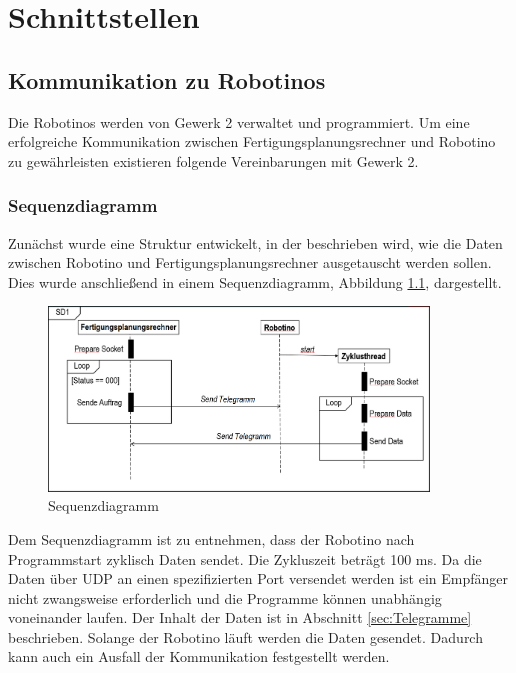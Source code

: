 
\chapter{Schnittstellen}
\label{sec:Schnittstellen}


\section{Kommunikation zu Robotinos}
\label{sec:Gewerk2Protokoll}

Die Robotinos werden von Gewerk 2 verwaltet und programmiert. Um eine erfolgreiche Kommunikation zwischen Fertigungsplanungsrechner und Robotino zu gewährleisten existieren folgende Vereinbarungen mit Gewerk 2.

\subsection{Sequenzdiagramm}
\label{sec:sequenzdiagram}

Zunächst wurde eine Struktur entwickelt, in der beschrieben wird, wie die Daten zwischen Robotino und Fertigungsplanungsrechner ausgetauscht werden sollen. Dies wurde anschließend in einem Sequenzdiagramm, Abbildung \ref{fig:Sequenzdiagramm}, dargestellt. 

\begin{figure}[htb]
    \centering
    \includegraphics[width=0.9\textwidth]{Abbildungen/Sequenzdiagramm.PNG}
    \caption{Sequenzdiagramm}		
    \label{fig:Sequenzdiagramm}
\end{figure}

Dem Sequenzdiagramm ist zu entnehmen, dass der Robotino nach Programmstart zyklisch Daten sendet. Die Zykluszeit beträgt 100 ms. Da die Daten über UDP an einen spezifizierten Port versendet werden ist ein Empfänger nicht zwangsweise erforderlich und die Programme können unabhängig voneinander laufen. Der Inhalt der Daten ist in Abschnitt \ref{sec:Telegramme} beschrieben. Solange der Robotino läuft werden die Daten gesendet. Dadurch kann auch ein Ausfall der Kommunikation festgestellt werden. 

